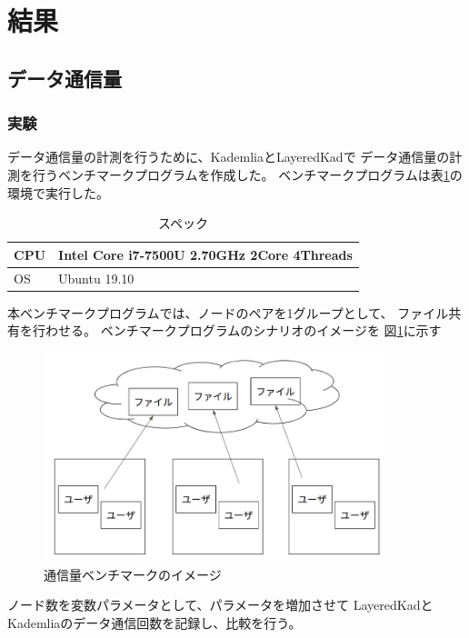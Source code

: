 \documentclass[sotsuron]{jcsie}
\begin{document}
\section{結果}
\subsection{データ通信量}

\subsubsection{実験}

データ通信量の計測を行うために、KademliaとLayeredKadで
データ通信量の計測を行うベンチマークプログラムを作成した。
ベンチマークプログラムは表\ref{table:spec-note}の環境で実行した。

\begin{table}[H]
	\caption{スペック}	
	\centering
	\label{table:spec-note}
	\begin{tabular}{|l|l|}
		\hline
		CPU &   
		Intel Core i7-7500U 2.70GHz 2Core 4Threads\\ 
		\hline	
		OS  &   
		Ubuntu 19.10 \\ 
		\hline
	\end{tabular}	
\end{table}

本ベンチマークプログラムでは、ノードのペアを1グループとして、
ファイル共有を行わせる。
ベンチマークプログラムのシナリオのイメージを
図\ref{fig:trafficBenchmark}に示す

\begin{figure}[H]
	\centering
	\includegraphics[width=10cm]{./assets/image/traffic_benchmark.png}
	\caption{通信量ベンチマークのイメージ}
	\label{fig:trafficBenchmark}
\end{figure}

ノード数を変数パラメータとして、パラメータを増加させて
LayeredKadとKademliaのデータ通信回数を記録し、比較を行う。
\end{document}
